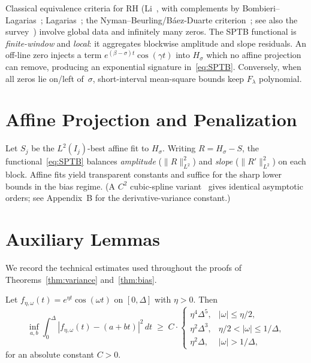 Classical equivalence criteria for RH
(Li~\cite{li}, with complements by Bombieri--Lagarias~\cite{bombieri-lagarias};
Lagarias~\cite{lagarias}; the Nyman--Beurling/B\'aez-Duarte criterion~\cite{beurling,baezduarte};
see also the survey~\cite{conrey})
involve global data and infinitely many zeros.  The SPTB functional is
\emph{finite-window} and \emph{local}: it aggregates blockwise amplitude and slope
residuals.  An off-line zero injects a term
$e^{(\beta-\sigma)t}\cos(\gamma t)$ into $H_\sigma$ which no affine projection can remove,
producing an exponential signature in~\eqref{eq:SPTB}.
Conversely, when all zeros lie on/left of~$\sigma$, short-interval
mean-square bounds keep $F_\lambda$ polynomial.

\section{Affine Projection and Penalization}

Let $S_j$ be the $L^2(I_j)$-best affine fit to $H_\sigma$.
Writing $R = H_\sigma - S$, the functional~\eqref{eq:SPTB}
balances \emph{amplitude} ($\|R\|_{L^2}^2$) and \emph{slope} ($\|R'\|_{L^2}^2$)
on each block.  Affine fits yield transparent constants and suffice
for the sharp lower bounds in the bias regime.
(A $C^2$ cubic-spline variant~\cite{deboor} gives identical asymptotic orders;
see Appendix~B for the derivative-variance constant.)

\section{Auxiliary Lemmas}\label{sec:aux-lemmas}

We record the technical estimates used throughout the proofs of
Theorems~\ref{thm:variance} and~\ref{thm:bias}.

\begin{lemma}\label{lem:affine-lb}
Let $f_{\eta,\omega}(t) = e^{\eta t}\cos(\omega t)$ on $[0,\Delta]$ with $\eta > 0$.
Then
\[
\inf_{a,b}\int_0^{\Delta} |f_{\eta,\omega}(t) - (a+bt)|^2\,dt
\;\ge\; C \cdot
\begin{cases}
\eta^4 \Delta^5, & |\omega| \le \eta/2, \\
\eta^2 \Delta^3, & \eta/2 < |\omega| \le 1/\Delta, \\
\eta^2 \Delta, & |\omega| > 1/\Delta,
\end{cases}
\]
for an absolute constant $C>0$.
\end{lemma}


